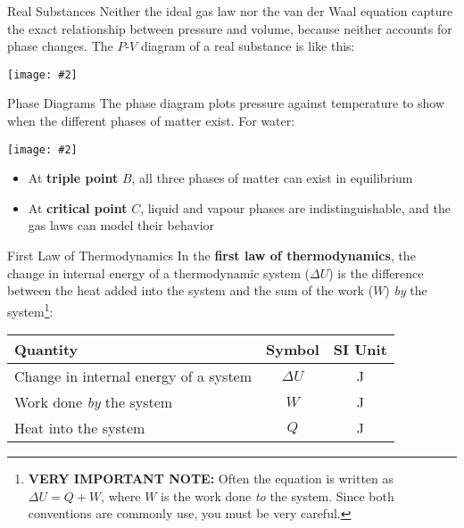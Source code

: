 \documentclass[12pt,aspectratio=169]{beamer}
\newcommand{\pic}[2]{
  \begin{center}
    \texttt{[image: \#2]}
  \end{center}
}
\newcommand{\eq}[2]{
  \vspace{#1}{\Large
    \begin{displaymath}
      #2
    \end{displaymath}
  }
}
\begin{document}
\begin{frame}{Real Substances}
  Neither the ideal gas law nor the van der Waal equation capture the exact
  relationship between pressure and volume, because neither accounts for phase
  changes. The $P$-$V$ diagram of a real substance is like this:
  \pic{.35}{realsubstance}
\end{frame}



\begin{frame}{Phase Diagrams}
  The phase diagram plots pressure against temperature to show when the
  different phases of matter exist. For water:
  \pic{.4}{10-figure-31}
  \begin{itemize}
  \item\vspace{-.1in} At \textbf{triple point} $B$, all three phases of matter
    can exist in equilibrium
  \item At \textbf{critical point} $C$, liquid and vapour phases are
    indistinguishable, and the gas laws can model their behavior
  \end{itemize}
\end{frame}



\begin{frame}{First Law of Thermodynamics}
  In the \textbf{first law of thermodynamics}, the change in internal energy of
  a thermodynamic system ($\Delta U$) is the difference between the heat added
  into the system and the sum of the work ($W$) \emph{by} the
  system\footnote{\textbf{VERY IMPORTANT NOTE:} Often the equation is written
    as $\Delta U=Q+W$, where $W$ is the work done \emph{to} the system. Since
    both conventions are commonly use, you must be very careful.}:
  
  \eq{-.2in}{
    \boxed{\Delta U=Q-W}
  }
  \begin{center}
    \begin{tabular}{l|c|c}
      \rowcolor{pink}
      \textbf{Quantity} & \textbf{Symbol} & \textbf{SI Unit} \\ \hline
      Change in internal energy of a system & $\Delta U$ & \si{\joule} \\
      Work done \emph{by} the system & $W$               & \si{\joule} \\
      Heat into the system           & $Q$               & \si{\joule}
    \end{tabular}
  \end{center}
\end{frame}
\end{document}
